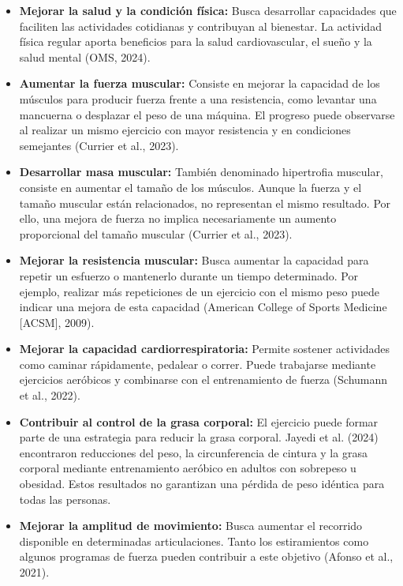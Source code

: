 \begin{itemize}
    \item \textbf{Mejorar la salud y la condición física:}
    Busca desarrollar capacidades que faciliten las actividades cotidianas y
    contribuyan al bienestar. La actividad física regular aporta beneficios
    para la salud cardiovascular, el sueño y la salud mental (OMS, 2024).

    \item \textbf{Aumentar la fuerza muscular:}
    Consiste en mejorar la capacidad de los músculos para producir fuerza
    frente a una resistencia, como levantar una mancuerna o desplazar el peso
    de una máquina. El progreso puede observarse al realizar un mismo ejercicio
    con mayor resistencia y en condiciones semejantes (Currier et al., 2023).

    \item \textbf{Desarrollar masa muscular:}
    También denominado hipertrofia muscular, consiste en aumentar el tamaño de
    los músculos. Aunque la fuerza y el tamaño muscular están relacionados, no
    representan el mismo resultado. Por ello, una mejora de fuerza no implica
    necesariamente un aumento proporcional del tamaño muscular (Currier et al.,
    2023).

    \item \textbf{Mejorar la resistencia muscular:}
    Busca aumentar la capacidad para repetir un esfuerzo o mantenerlo durante
    un tiempo determinado. Por ejemplo, realizar más repeticiones de un
    ejercicio con el mismo peso puede indicar una mejora de esta capacidad
    (American College of Sports Medicine [ACSM], 2009).

    \item \textbf{Mejorar la capacidad cardiorrespiratoria:}
    Permite sostener actividades como caminar rápidamente, pedalear o correr.
    Puede trabajarse mediante ejercicios aeróbicos y combinarse con el
    entrenamiento de fuerza (Schumann et al., 2022).

    \item \textbf{Contribuir al control de la grasa corporal:}
    El ejercicio puede formar parte de una estrategia para reducir la grasa
    corporal. Jayedi et al. (2024) encontraron reducciones del peso, la
    circunferencia de cintura y la grasa corporal mediante entrenamiento
    aeróbico en adultos con sobrepeso u obesidad. Estos resultados no
    garantizan una pérdida de peso idéntica para todas las personas.

    \item \textbf{Mejorar la amplitud de movimiento:}
    Busca aumentar el recorrido disponible en determinadas articulaciones.
    Tanto los estiramientos como algunos programas de fuerza pueden contribuir
    a este objetivo (Afonso et al., 2021).
\end{itemize}

